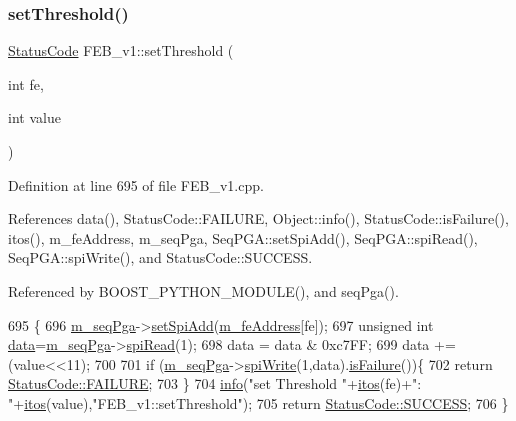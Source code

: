 \subsubsection{\texorpdfstring{set\+Threshold()}{setThreshold()}}
{\footnotesize\ttfamily \hyperlink{classStatusCode}{Status\+Code} F\+E\+B\+\_\+v1\+::set\+Threshold (\begin{DoxyParamCaption}\item[{int}]{fe,  }\item[{int}]{value }\end{DoxyParamCaption})}



Definition at line 695 of file F\+E\+B\+\_\+v1.\+cpp.



References data(), Status\+Code\+::\+F\+A\+I\+L\+U\+RE, Object\+::info(), Status\+Code\+::is\+Failure(), itos(), m\+\_\+fe\+Address, m\+\_\+seq\+Pga, Seq\+P\+G\+A\+::set\+Spi\+Add(), Seq\+P\+G\+A\+::spi\+Read(), Seq\+P\+G\+A\+::spi\+Write(), and Status\+Code\+::\+S\+U\+C\+C\+E\+SS.



Referenced by B\+O\+O\+S\+T\+\_\+\+P\+Y\+T\+H\+O\+N\+\_\+\+M\+O\+D\+U\+L\+E(), and seq\+Pga().


\begin{DoxyCode}
695                                                   \{
696   \hyperlink{classFEB__v1_a6c7804ac86796f233a8393043adf2e77}{m\_seqPga}->\hyperlink{classSeqPGA_ac998ce3a6d9b5f2e88cc8393f8c1df53}{setSpiAdd}(\hyperlink{classFEB__v1_a4e1945c2d5b434125f375e9d0fc6d99f}{m\_feAddress}[fe]);
697   \textcolor{keywordtype}{unsigned} \textcolor{keywordtype}{int} \hyperlink{classFEB__v1_a6bca4320bd3bbbc32efc81097f33421a}{data}=\hyperlink{classFEB__v1_a6c7804ac86796f233a8393043adf2e77}{m\_seqPga}->\hyperlink{classSeqPGA_ab3d0e5e5d4014bc7a92588a76b8713d4}{spiRead}(1);
698   data = data & 0xc7FF;
699   data += (value<<11);
700   
701   \textcolor{keywordflow}{if} (\hyperlink{classFEB__v1_a6c7804ac86796f233a8393043adf2e77}{m\_seqPga}->\hyperlink{classSeqPGA_ad4421841ce4ce8b88ad13f63216f0743}{spiWrite}(1,data).\hyperlink{classStatusCode_a5dd22dc6eb2c52fc4cabc58f6dea2eb7}{isFailure}())\{
702     \textcolor{keywordflow}{return} \hyperlink{classStatusCode_a6f565cbeadc76d14c72f047e5e85eb4ba3da73d4c469762eb9d3c960368252b26}{StatusCode::FAILURE};
703   \}
704   \hyperlink{classObject_a644fd329ea4cb85f54fa6846484b84a8}{info}(\textcolor{stringliteral}{"set Threshold "}+\hyperlink{Tools_8h_af330027dbdafb9a30768b3613c553e60}{itos}(fe)+\textcolor{stringliteral}{": "}+\hyperlink{Tools_8h_af330027dbdafb9a30768b3613c553e60}{itos}(value),\textcolor{stringliteral}{"FEB\_v1::setThreshold"});
705   \textcolor{keywordflow}{return} \hyperlink{classStatusCode_a6f565cbeadc76d14c72f047e5e85eb4badd0da38d3ba0d922efd1f4619bc37ad8}{StatusCode::SUCCESS};
706 \}
\end{DoxyCode}
\mbox{\label{classObject_a89557dbbad5bcaa02652f5d7fa35d20f}} 
